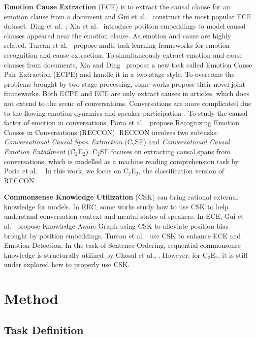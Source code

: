 \documentclass{article}
\begin{document}
\textbf{Emotion Cause Extraction} (ECE) is to extract the causal clause for an emotion clause from a document and Gui et al.~ construct the most popular ECE dataset. Ding et al.~; Xia et al.~ introduce position embeddings to model causal clauses appeared near the emotion clause. As emotion and cause are highly related, Turcan et al.~ propose multi-task learning frameworks for emotion recognition and cause extraction. To simultaneously extract emotion and cause clauses from documents, Xia and Ding~ propose a new task called Emotion Cause Pair Extraction (ECPE) and handle it in a two-stage style. To overcome the problems brought by two-stage processing, some works \cite{ECPE_2D,Rank_Emotion,SlidingWindow} propose their novel joint frameworks. Both ECPE and ECE are only extract causes in articles, which does not extend to the scene of conversations. Conversations are more complicated due to the flowing emotion dynamics and speaker participation \cite{DialogueGCN}. To study the causal factor of emotion in conversations, Poria et al.~ propose Recognizing Emotion Causes in Conversations (RECCON). RECCON involves two subtasks: \textit{Conversational Causal Span Extraction} (C$_2$SE) and \textit{Conversational Causal Emotion Entailment} (C$_2$E$_2$). C$_2$SE focuses on extracting causal spans from conversations, which is modelled as a machine reading comprehension task by Poria et al.~. In this work, we focus on C$_2$E$_2$, the classification version of RECCON. 

\textbf{Commonsense Knowledge Utilization} (CSK) can bring rational external knowledge for models. In ERC, some works \cite{KET,COMSIC,SKAIG} study how to use CSK to help understand conversation context and mental states of speakers. In ECE, Gui et al.~ propose Knowledge-Aware Graph using CSK to alleviate position bias brought by position embeddings. Turcan et al.~ use CSK to enhance ECE and Emotion Detection. In the task of Sentence Ordering, sequential commonsense knowledge is structurally utilized by Ghosal et al., . However, for C$_2$E$_2$, it is still under explored how to properly use CSK. 

\section{Method}

\subsection{Task Definition}
\end{document}
